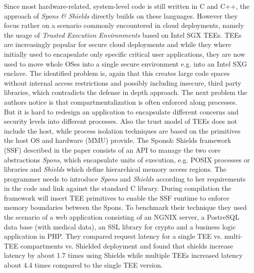 Since most hardware-related, system-level code is still written in C and C++, the approach of \emph{Spons \& Shields}\cite{SponsAndShields} directly builds on these languages. However  they focus rather on a scenario commonly encountered in cloud deployments, namely the usage of \emph{Trusted Execution Environments} based on Intel SGX TEEs. TEEs are increasingly popular for secure cloud deployments and while they where initially used to encapsulate only specific critical user applications, they are now used to move whole OSes into a single secure environment e.g. into an Intel SXG enclave. The identified problem is, again that this creates large code spaces without internal access restrictions and possibly including insecure, third party libraries, which contradicts the defense in depth approach. The next problem the authors notice is that compartmentalization is often enforced along processes. But it is hard to redesign an application to encapsulate different concerns and security levels into different processes. Also the trust model of TEEs does not include the host, while process isolation techniques are based on the primitives the host OS and hardware (MMU) provide. The Spons\& Shields framework (SSF) described in the paper consists of an API to manage the two core abstractions \emph{Spons}, which encapsulate units of execution, e.g. POSIX processes or libraries and \emph{Shields} which define hierarchical memory access regions. The programmer needs to introduce \emph{Spons} and \emph{Shields} according to her requirements in the code and link against the  standard C library. During compilation the framework will insert TEE primitives to enable the SSF runtime to enforce memory boundaries between the Spons. To benchmark their technique they used the scenario of a web application consisting of an NGNIX server, a PostreSQL data base (with medical data), an SSL library for crypto and a business logic application in PHP. They compared request latency for a single TEE vs. multi-TEE compartments vs. Shielded deployment and found that shields increase latency by about 1.7 times using Shields while multiple TEEs increased latency about 4.4 times compared to the single TEE version.\\

